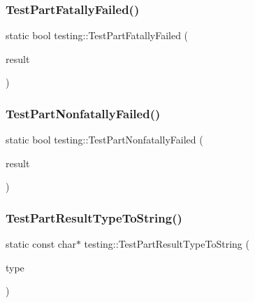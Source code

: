 \mbox{\label{namespacetesting_a9f19442d566c7eaec0702b9fcf282b63}} 
\subsubsection{\texorpdfstring{TestPartFatallyFailed()}{TestPartFatallyFailed()}}
{\footnotesize\ttfamily static bool testing\+::\+Test\+Part\+Fatally\+Failed (\begin{DoxyParamCaption}\item[{const Test\+Part\+Result \&}]{result }\end{DoxyParamCaption})\hspace{0.3cm}{\ttfamily [static]}}

\mbox{\label{namespacetesting_af256d104ca665115eb291f762bb659e3}} 
\subsubsection{\texorpdfstring{TestPartNonfatallyFailed()}{TestPartNonfatallyFailed()}}
{\footnotesize\ttfamily static bool testing\+::\+Test\+Part\+Nonfatally\+Failed (\begin{DoxyParamCaption}\item[{const Test\+Part\+Result \&}]{result }\end{DoxyParamCaption})\hspace{0.3cm}{\ttfamily [static]}}

\mbox{\label{namespacetesting_a4e9fdeef31f7e49afccfde0532f76864}} 
\subsubsection{\texorpdfstring{TestPartResultTypeToString()}{TestPartResultTypeToString()}}
{\footnotesize\ttfamily static const char$\ast$ testing\+::\+Test\+Part\+Result\+Type\+To\+String (\begin{DoxyParamCaption}\item[{Test\+Part\+Result\+::\+Type}]{type }\end{DoxyParamCaption})\hspace{0.3cm}{\ttfamily [static]}}

